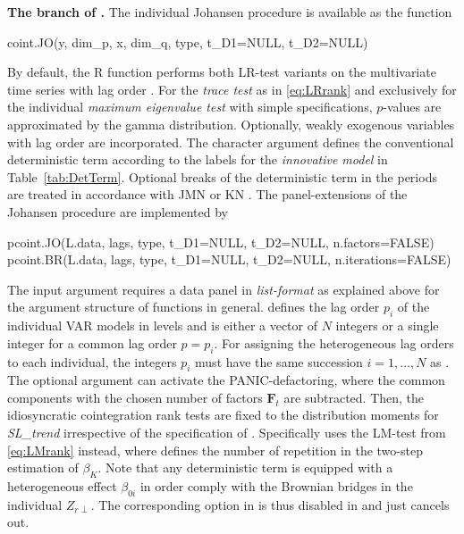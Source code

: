 \textbf{The branch of \citeauthor{Johansen1996}.} The individual Johansen procedure is available as the function
\begin{CodeChunk}
\begin{CodeInput}
coint.JO(y, dim_p, x, dim_q, type, t_D1=NULL, t_D2=NULL)
\end{CodeInput}
\end{CodeChunk}
By default, the \textsf{R} function performs both LR-test variants on the  multivariate time series  with lag order . For the \textit{trace test} as in \eqref{eq:LRrank} and exclusively for the individual \textit{maximum eigenvalue test} with simple specifications, $p$-values are approximated by the gamma distribution. Optionally, weakly exogenous variables  with lag order  are incorporated. The character argument  defines the conventional deterministic term according to the labels for the \textit{innovative model} in Table~\ref{tab:DetTerm}. Optional breaks of the deterministic term in the periods  are treated in accordance with JMN \citeyearpar{JohansenEtAl2000} or KN \citeyearpar{KuritaNielsen2019}. The panel-extensions of the Johansen procedure are implemented by
\begin{CodeChunk}
\begin{CodeInput}
pcoint.JO(L.data, lags, type, t_D1=NULL, t_D2=NULL, n.factors=FALSE)
pcoint.BR(L.data, lags, type, t_D1=NULL, t_D2=NULL, n.iterations=FALSE)
\end{CodeInput}
\end{CodeChunk}
The input argument  requires a data panel in \textit{list-format} as explained above for the argument structure of  functions in general.  defines the lag order $ p_i $ of the individual VAR models in levels and is either a vector of $ N $ integers or a single integer for a common lag order $ p=p_i $. For assigning the heterogeneous lag orders to each individual, the integers $ p_i $ must have the same succession  $ i = 1, \ldots , N $ as . The optional argument  can activate the PANIC-defactoring, where the common components with the chosen number of factors $ \boldsymbol{F}_t $ are subtracted. Then, the idiosyncratic cointegration rank tests are fixed to the distribution moments for \textit{SL\_trend} irrespective of the specification of . Specifically  uses the LM-test from \eqref{eq:LMrank} instead, where  defines the number of repetition in the two-step estimation of $ \beta_{K} $. Note that any deterministic term is equipped with a heterogeneous effect $ \beta_{0i} $ in order comply with the Brownian bridges in the individual $ Z_{r\perp} $. The corresponding option  in  is thus disabled in   and just cancels out.


